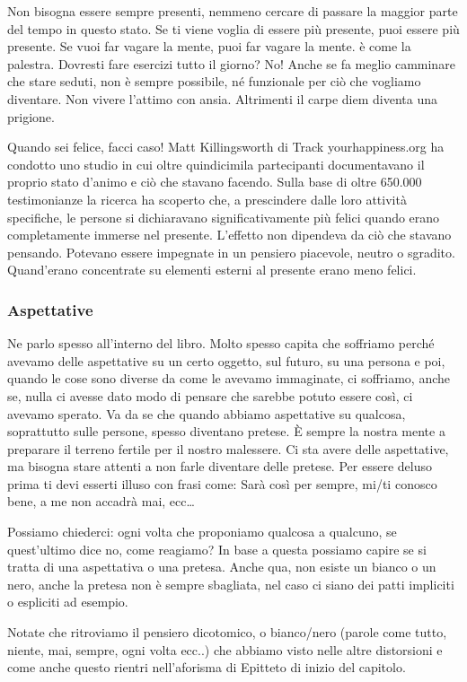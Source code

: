 \documentclass[12pt]{book} %
\begin{document}
Non bisogna essere sempre presenti, nemmeno cercare di passare la maggior parte del tempo in questo stato. Se ti viene
voglia di essere più presente, puoi essere più presente. Se vuoi far vagare la mente, puoi far vagare la mente. è come
la palestra. Dovresti fare esercizi tutto il giorno? No! Anche se fa meglio camminare che stare seduti, non è sempre
possibile, né funzionale per ciò che vogliamo diventare. Non vivere l'attimo con ansia. Altrimenti il carpe diem diventa una prigione.

Quando sei felice, facci caso!
Matt Killingsworth di Track yourhappiness.org ha condotto uno studio in cui oltre quindicimila partecipanti
documentavano il proprio stato d'animo e ciò che stavano facendo. Sulla base di oltre 650.000
testimonianze la ricerca ha scoperto che, a prescindere dalle loro attività specifiche, le persone si dichiaravano
significativamente più felici quando erano completamente immerse nel presente. L'effetto non
dipendeva da ciò che stavano pensando. Potevano essere impegnate in un pensiero piacevole, neutro o sgradito.
Quand'erano concentrate su elementi esterni al presente erano meno felici. 

\subsubsection{Aspettative}
Ne parlo spesso all'interno del libro. Molto spesso capita che soffriamo perché avevamo delle
aspettative su un certo oggetto, sul futuro, su una persona e poi, quando le cose sono diverse da come le avevamo
immaginate, ci soffriamo, anche se, nulla ci avesse dato modo di pensare che sarebbe potuto essere così, ci avevamo
sperato. Va da se che quando abbiamo aspettative su qualcosa, soprattutto sulle persone, spesso diventano pretese. È sempre
la nostra mente a preparare il terreno fertile per il nostro malessere.
Ci sta avere delle aspettative, ma bisogna stare attenti a non farle diventare delle pretese. 
Per essere deluso prima ti devi esserti illuso con frasi come: Sarà così per sempre, mi/ti conosco bene, a me non accadrà mai, ecc…

Possiamo chiederci: ogni volta che proponiamo qualcosa a qualcuno, se quest'ultimo dice no, come reagiamo? In base a
questa possiamo capire se si tratta di una aspettativa o una pretesa. Anche qua, non esiste un bianco o un nero, anche
la pretesa non è sempre sbagliata, nel caso ci siano dei patti impliciti o espliciti ad esempio.

Notate che ritroviamo il pensiero dicotomico, o bianco/nero (parole come tutto, niente, mai, sempre, ogni volta ecc..) che abbiamo visto nelle altre distorsioni e come anche questo rientri nell'aforisma di Epitteto di inizio del capitolo.
\end{document}
